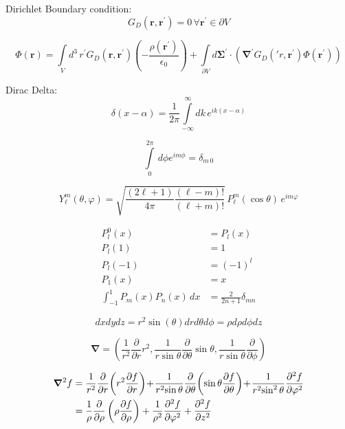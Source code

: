 \documentclass[a4paper, twocolumn]{article}
\renewcommand{\vec}[1]{\boldsymbol{#1}}
\begin{document}
Dirichlet Boundary condition:
\begin{equation*}
    G_{D}(\vec{r}, \vec{r}^{\prime}) = 0 \, \forall \vec{r}^{\prime} \in \partial V
\end{equation*}

\begin{equation*}
    \Phi(\vec{r}) =
    \int\limits_{V} d^{3} \, r^{\prime} G_{D}(\vec{r}, \vec{r}^{\prime}) \left( - \frac{\rho(\vec{r}^{\prime})}{\epsilon_{0}}\right)
    + \int\limits_{\partial V} d \vec{\Sigma}^{\prime} \cdot \left( \vec{\nabla}^{\prime} G_{D}(\prime{r}, \vec{r}^{\prime}) \Phi(\vec{r}^{\prime})  \right)
\end{equation*}


Dirac Delta:
\begin{equation*}
    \delta(x-\alpha) = \frac{1}{2\pi} \int\limits_{-\infty}^{\infty} dk \, e^{ik(x-\alpha)}
\end{equation*}

\begin{equation*}
    \int\limits_{0}^{2 \pi} \, d\phi e^{i m \phi}= \delta_{m \, 0}
\end{equation*}

\begin{equation*}
    Y_\ell^m( \theta , \varphi ) = \sqrt{\frac{(2\ell+1)}{ 4\pi}\frac{(\ell-m)! }{ (\ell+m)!}}  \, P_\ell^m ( \cos{\theta} ) \, e^{i m \varphi }
\end{equation*}


\begin{align*}
    P_{l}^{0}(x) &= P_{l}(x) \\
    P_{l}(1) &= 1 \\
    P_{l}(-1) &= (-1)^{l} \\
    P_{1}(x) &= x \\
    \int_{-1}^1 P_m(x) P_n(x)\,dx &= \frac{2}{2n + 1} \delta_{mn}
\end{align*}


\begin{equation*}
    dxdydz = r^{2} \sin(\theta) dr d\theta d\phi = \rho d\rho d\phi dz
\end{equation*}

\begin{equation*}
    \vec{\nabla} = (\frac{1}{r^2} \frac{\partial}{\partial r} r^2, \frac{1}{r\sin\theta} \frac{\partial}{\partial \theta} \sin\theta, \frac{1}{r\sin\theta} \frac{\partial}{\partial \phi})
\end{equation*}

\begin{align*}
    \vec{\nabla}^2 f
    &= {1 \over r^2}{\partial \over \partial r}\!\left(r^2 {\partial f \over \partial r}\right)
\!+\!{1 \over r^2\!\sin\theta}{\partial \over \partial \theta}\!\left(\sin\theta {\partial f \over \partial \theta}\right)
\!+\!{1 \over r^2\!\sin^2\theta}{\partial^2 f \over \partial \varphi^2} \\
    &= {1 \over \rho}{\partial \over \partial \rho}\left(\rho {\partial f \over \partial \rho}\right)
+ {1 \over \rho^2}{\partial^2 f \over \partial \varphi^2}
+ {\partial^2 f \over \partial z^2}
\end{align*}
\end{document}

